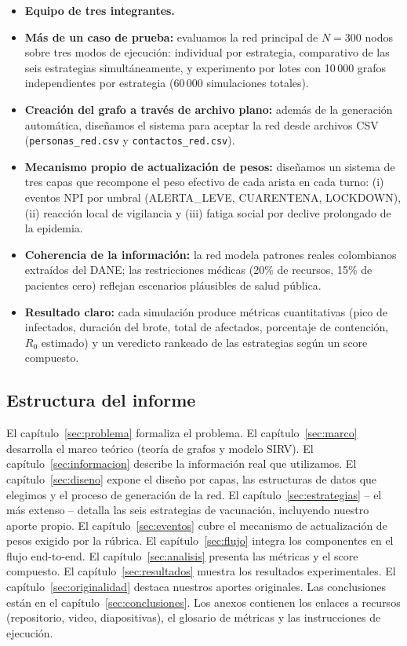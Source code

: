 \documentclass[spanish,notitlepage,letterpaper, 12pt]{article}
\begin{document}
\begin{itemize}[leftmargin=*]
    \item \textbf{Equipo de tres integrantes.}
    \item \textbf{M\'as de un caso de prueba:} evaluamos la red principal de $N = 300$ nodos sobre tres modos de ejecuci\'on: individual por estrategia, comparativo de las seis estrategias simult\'aneamente, y experimento por lotes con 10\,000 grafos independientes por estrategia (60\,000 simulaciones totales).
    \item \textbf{Creaci\'on del grafo a trav\'es de archivo plano:} adem\'as de la generaci\'on autom\'atica, dise\~namos el sistema para aceptar la red desde archivos CSV (\texttt{personas\_red.csv} y \texttt{contactos\_red.csv}).
    \item \textbf{Mecanismo propio de actualizaci\'on de pesos:} dise\~namos un sistema de tres capas que recompone el peso efectivo de cada arista en cada turno: (i) eventos NPI por umbral (ALERTA\_LEVE, CUARENTENA, LOCKDOWN), (ii) reacci\'on local de vigilancia y (iii) fatiga social por declive prolongado de la epidemia.
    \item \textbf{Coherencia de la informaci\'on:} la red modela patrones reales colombianos extra\'idos del DANE; las restricciones m\'edicas (20\% de recursos, 15\% de pacientes cero) reflejan escenarios pl\'ausibles de salud p\'ublica.
    \item \textbf{Resultado claro:} cada simulaci\'on produce m\'etricas cuantitativas (pico de infectados, duraci\'on del brote, total de afectados, porcentaje de contenci\'on, $R_0$ estimado) y un veredicto rankeado de las estrategias seg\'un un score compuesto.
\end{itemize}

\subsection{Estructura del informe}

El cap\'itulo~\ref{sec:problema} formaliza el problema. El cap\'itulo~\ref{sec:marco} desarrolla el marco te\'orico (teor\'ia de grafos y modelo SIRV). El cap\'itulo~\ref{sec:informacion} describe la informaci\'on real que utilizamos. El cap\'itulo~\ref{sec:diseno} expone el dise\~no por capas, las estructuras de datos que elegimos y el proceso de generaci\'on de la red. El cap\'itulo~\ref{sec:estrategias} -- el m\'as extenso -- detalla las seis estrategias de vacunaci\'on, incluyendo nuestro aporte propio. El cap\'itulo~\ref{sec:eventos} cubre el mecanismo de actualizaci\'on de pesos exigido por la r\'ubrica. El cap\'itulo~\ref{sec:flujo} integra los componentes en el flujo end-to-end. El cap\'itulo~\ref{sec:analisis} presenta las m\'etricas y el score compuesto. El cap\'itulo~\ref{sec:resultados} muestra los resultados experimentales. El cap\'itulo~\ref{sec:originalidad} destaca nuestros aportes originales. Las conclusiones est\'an en el cap\'itulo~\ref{sec:conclusiones}. Los anexos contienen los enlaces a recursos (repositorio, video, diapositivas), el glosario de m\'etricas y las instrucciones de ejecuci\'on.
\end{document}

